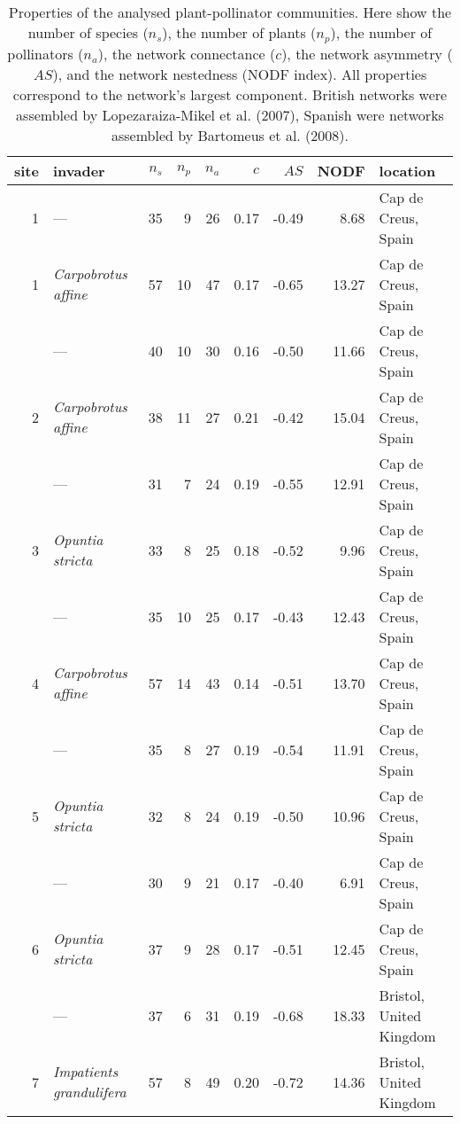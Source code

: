 \documentclass[a4paper]{artikel1}
\theoremstyle{definition}
\theoremstyle{definition}
\theoremstyle{definition}
\theoremstyle{remark}
\begin{document}
\begin{table}

\caption{\label{tab:table-network-properties}Properties of the analysed plant-pollinator communities. Here show the number of species ($n_s$), the number of plants ($n_p$), the number of pollinators ($n_a$), the network connectance ($c$), the network asymmetry ($AS$), and the network nestedness (NODF index). All properties correspond to the network's largest component. British networks were assembled by Lopezaraiza-Mikel et al. (2007), Spanish were networks assembled by Bartomeus et al. (2008).}
\centering
\fontsize{8}{10}\selectfont
\begin{tabular}[t]{rlrrrrrrl}
\toprule
site & invader & $n_s$ & $n_p$ & $n_a$ & $c$ & $AS$ & NODF & location\\
\midrule
1 & — & 35 & 9 & 26 & 0.17 & -0.49 & 8.68 & Cap de Creus, Spain\\
1 & \textit{Carpobrotus affine} & 57 & 10 & 47 & 0.17 & -0.65 & 13.27 & Cap de Creus, Spain\\
\addlinespace
2 & — & 40 & 10 & 30 & 0.16 & -0.50 & 11.66 & Cap de Creus, Spain\\
2 & \textit{Carpobrotus affine} & 38 & 11 & 27 & 0.21 & -0.42 & 15.04 & Cap de Creus, Spain\\
\addlinespace
3 & — & 31 & 7 & 24 & 0.19 & -0.55 & 12.91 & Cap de Creus, Spain\\
3 & \textit{Opuntia stricta} & 33 & 8 & 25 & 0.18 & -0.52 & 9.96 & Cap de Creus, Spain\\
\addlinespace
4 & — & 35 & 10 & 25 & 0.17 & -0.43 & 12.43 & Cap de Creus, Spain\\
4 & \textit{Carpobrotus affine} & 57 & 14 & 43 & 0.14 & -0.51 & 13.70 & Cap de Creus, Spain\\
\addlinespace
5 & — & 35 & 8 & 27 & 0.19 & -0.54 & 11.91 & Cap de Creus, Spain\\
5 & \textit{Opuntia stricta} & 32 & 8 & 24 & 0.19 & -0.50 & 10.96 & Cap de Creus, Spain\\
\addlinespace
6 & — & 30 & 9 & 21 & 0.17 & -0.40 & 6.91 & Cap de Creus, Spain\\
6 & \textit{Opuntia stricta} & 37 & 9 & 28 & 0.17 & -0.51 & 12.45 & Cap de Creus, Spain\\
\addlinespace
7 & — & 37 & 6 & 31 & 0.19 & -0.68 & 18.33 & Bristol, United Kingdom\\
7 & \textit{Impatients grandulifera} & 57 & 8 & 49 & 0.20 & -0.72 & 14.36 & Bristol, United Kingdom\\

\end{tabular}
\end{table}
\end{document}
